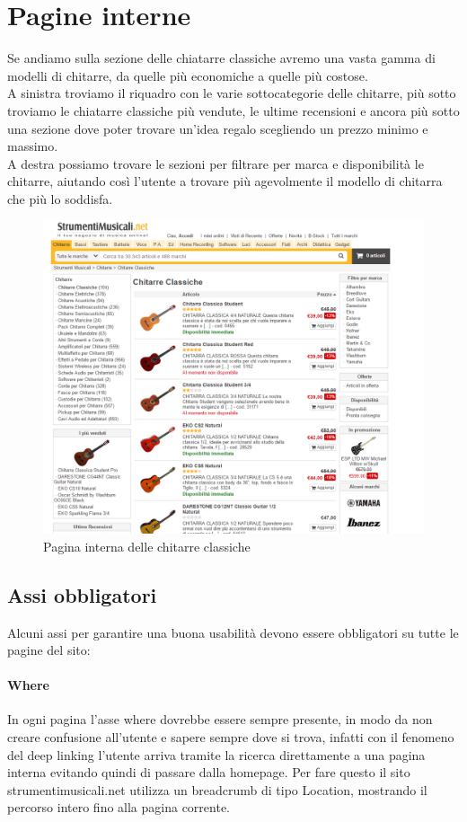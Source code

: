 \documentclass[12pt]{article}
\begin{document}
	\section{Pagine interne}
	Se andiamo sulla sezione delle chiatarre classiche avremo una vasta gamma di modelli di chitarre, da quelle più economiche a quelle più costose. \\ A sinistra troviamo il riquadro con le varie sottocategorie delle chitarre, più sotto troviamo le chiatarre classiche più vendute, le ultime recensioni e ancora più sotto una sezione dove poter trovare un'idea regalo scegliendo un prezzo minimo e massimo. \\ A destra possiamo trovare le sezioni per filtrare per marca e disponibilità le chitarre, aiutando così l'utente a trovare più agevolmente il modello di chitarra che più lo soddisfa.
	\begin{figure}[ht!]
		\centering	
		\includegraphics[width=145mm]{images/paginaInterna.png}
		\caption{Pagina interna delle chitarre classiche}
	\end{figure}
	\subsection{Assi obbligatori}
	\vspace{0.5cm}
	Alcuni assi per garantire una buona usabilità devono essere obbligatori su tutte le pagine del sito:
	\paragraph{Where} In ogni pagina l'asse where dovrebbe essere sempre presente, in modo da non creare confusione all'utente e sapere sempre dove si trova, infatti con il fenomeno del deep linking l'utente arriva tramite la ricerca direttamente a una pagina interna evitando quindi di passare dalla homepage. Per fare questo il sito strumentimusicali.net utilizza un breadcrumb di tipo Location, mostrando il percorso intero fino alla pagina corrente. 
\end{document}
